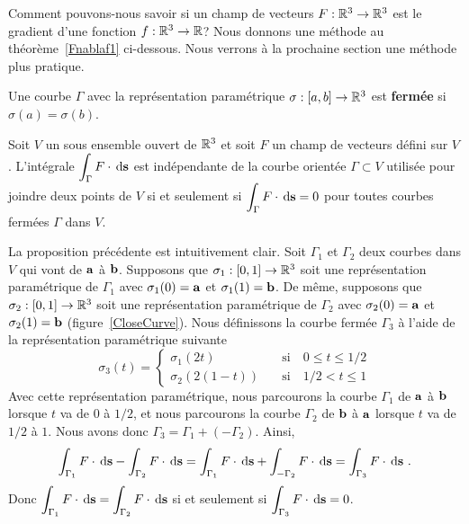 {Comment pouvons-nous savoir si un champ de vecteurs $F:\mathbb{R}^3 \to \mathbb{R}^3$ est
le gradient d'une fonction $f:\mathbb{R}^3 \to \mathbb{R}$?  Nous donnons une méthode au
théorème~\ref{Fnablaf1} ci-dessous.  Nous verrons à la prochaine section une
méthode plus pratique.

\begin{defn} 
Une courbe $\Gamma$ avec la représentation paramétrique
$\sigma:[a,b]\to \mathbb{R}^3$ est {\bfseries fermée} si $\sigma(a) = \sigma(b)$.
\end{defn}

\begin{prop}
Soit $V$ un sous ensemble ouvert de $\mathbb{R}^3$ et soit $F$ un champ de
vecteurs défini sur $V$.  L'intégrale
$\displaystyle \int_\Gamma F \cdot \,\mathrm{d}\mathbf{s}$ est indépendante
de la courbe orientée $\Gamma \subset V$ utilisée pour joindre deux
points de $V$ si et seulement si
$\displaystyle \int_\Gamma F \cdot \,\mathrm{d}\mathbf{s} = 0$ pour toutes
courbes fermées $\Gamma$ dans $V$. 
\end{prop}

\begin{rmk}
La proposition précédente est intuitivement clair.  Soit $\Gamma_1$ et
$\Gamma_2$ deux courbes dans $V$ qui vont de $\mathbf{a}$ à $\mathbf{b}$.
Supposons que $\sigma_1:[0,1]\to \mathbb{R}^3$ soit une représentation
paramétrique de $\Gamma_1$ avec $\sigma_1(0) = \mathbf{a}$ et
$\sigma_1(1) = \mathbf{b}$.  De même, supposons que
$\sigma_2:[0,1]\to \mathbb{R}^3$ soit une représentation
paramétrique de $\Gamma_2$ avec $\sigma_2(0) = \mathbf{a}$ et
$\sigma_2(1) = \mathbf{b}$ (figure~\ref{CloseCurve}).
Nous définissons la courbe fermée $\Gamma_3$ à l'aide de la
représentation paramétrique suivante
\[
\sigma_3(t) = \begin{cases}
\sigma_1(2t) & \quad \text{si} \quad  0 \leq t \leq 1/2 \\
\sigma_2(2(1-t)) & \quad \text{si} \quad  1/2 < t \leq 1
\end{cases}
\]
Avec cette représentation paramétrique, nous parcourons la courbe
$\Gamma_1$ de $\mathbf{a}$ à $\mathbf{b}$ lorsque $t$ va de $0$ à $1/2$, et
nous parcourons la courbe $\Gamma_2$ de $\mathbf{b}$ à $\mathbf{a}$ lorsque $t$
va de $1/2$ à $1$.  Nous avons donc $\Gamma_3 = \Gamma_1 + (-\Gamma_2)$.
Ainsi,
\[
\int_{\Gamma_1} F \cdot \,\mathrm{d}\mathbf{s} -
\int_{\Gamma_2} F \cdot \,\mathrm{d}\mathbf{s}
= \int_{\Gamma_1} F \cdot \,\mathrm{d}\mathbf{s} + 
\int_{-\Gamma_2} F \cdot \,\mathrm{d}\mathbf{s}
= \int_{\Gamma_3} F \cdot \,\mathrm{d}\mathbf{s} \ .
\]
Donc $\displaystyle \int_{\Gamma_1} F \cdot \,\mathrm{d}\mathbf{s} =
\int_{\Gamma_2} F \cdot \,\mathrm{d}\mathbf{s}$ si et seulement si
$\displaystyle \int_{\Gamma_3} F \cdot \,\mathrm{d}\mathbf{s} = 0$.
\end{rmk}

}
